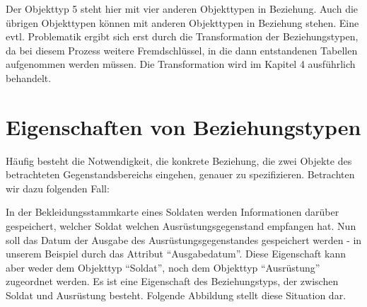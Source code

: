           \begin{center}
          \end{center}

        Der Objekttyp 5 steht hier mit vier anderen Objekttypen in Beziehung.
        Auch die übrigen Objekttypen können mit anderen Objekttypen in
        Beziehung stehen. Eine evtl. Problematik ergibt sich erst durch die
        Transformation der Beziehungstypen, da bei diesem Prozess weitere
        Fremdschlüssel, in die dann entstandenen Tabellen aufgenommen werden
        müssen. Die Transformation wird im Kapitel 4 ausführlich behandelt.
      \section{Eigenschaften von Beziehungstypen}
        \label{attributes_of_entities}
        Häufig besteht die Notwendigkeit, die konkrete Beziehung, die zwei
        Objekte des betrachteten Gegenstandsbereichs eingehen, genauer zu
        spezifizieren. Betrachten wir dazu folgenden Fall:

        In der Bekleidungsstammkarte eines Soldaten werden Informationen
        darüber gespeichert, welcher Soldat welchen Ausrüstungsgegenstand
        empfangen hat. Nun soll das Datum der Ausgabe des
        Ausrüstungsgegenstandes gespeichert werden - in unserem Beispiel durch
        das Attribut \enquote{Ausgabedatum}. Diese Eigenschaft kann aber weder
        dem Objekttyp \enquote{Soldat}, noch dem Objekttyp
        \enquote{Ausrüstung} zugeordnet werden. Es ist eine Eigenschaft des
        Beziehungstyps, der zwischen Soldat und Ausrüstung besteht. Folgende
        Abbildung stellt diese Situation dar.

